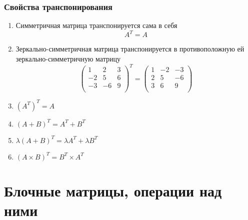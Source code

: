 \documentclass[11pt]{proc}
\begin{document}
\subsubsection{Свойства транспонирования}
\begin{enumerate}
	\item{Симметричная матрица транспонируется сама в себя \[A^T = A\]}
	\item{Зеркально-симметричная матрица транспонируется в противоположную ей зеркально-симметричную матрицу \[\begin{pmatrix}1&2&3\\-2&5&6\\-3&-6&9\\\end{pmatrix}^T = \begin{pmatrix}1&-2&-3\\2&5&-6\\3&6&9\\\end{pmatrix}\]}
	\item{$(A^T)^T = A$}
	\item{$(A+B)^T = A^T + B^T$}
	\item{$\lambda(A+B)^T = \lambda A^T + \lambda B^T$}
	\item{$(A \times B)^T = B^T \times A^T$}
\end{enumerate}
\section{Блочные матрицы, операции над ними}
\end{document}
